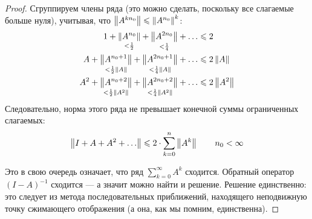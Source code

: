 \documentclass[12pt]{article}
\begin{document}
\begin{proof}
			Сгруппируем члены ряда (это можно сделать, поскольку все слагаемые больше нуля), учитывая, что $\left\| A^{k n_0} \right\| \leqslant \left\| A^{n_0} \right\|^{k}$:
			\begin{align*}
				1 + \underset{< \frac{1}{2}}{\left\| A^{n_0} \right\|} + \underset{< \frac{1}{4}}{\left\| A^{2n_0} \right\|} + \ldots &\leqslant 2 \\
				A + \underset{< \frac{1}{2}\left\| A \right\|}{\left\| A^{n_0+1} \right\|} 
				+ \underset{< \frac{1}{4}\left\| A \right\|}{\left\| A^{2n_0+1} \right\|} + \ldots &\leqslant 2 \left\| A \right\| \\
				A^2 + \underset{< \frac{1}{2}\left\| A^2 \right\|}{\left\| A^{n_0+2} \right\|} 
				+ \underset{< \frac{1}{4}\left\| A^2 \right\|}{\left\| A^{2n_0+2} \right\|} + \ldots &\leqslant 2 \left\| A^2 \right\| \\
			\end{align*}
			Следовательно, норма этого ряда не превышает конечной суммы ограниченных слагаемых:
			$$\left\| I + A + A^2 + \ldots \right\| \leqslant 2\cdot\sum_{k=0}^n\left\| A^k \right\| \qquad n_0 < \infty$$
			
			Это в свою очередь означает, что ряд $\sum_{k=0}^\infty A^k$ сходится. Обратный оператор $(I-A)^{-1}$ сходится --- а значит можно найти и решение. Решение единственно: это следует из метода последовательных приближений, находящего неподвижную точку сжимающего отображения (а она, как мы помним, единственна).
		\end{proof}
\end{document}
